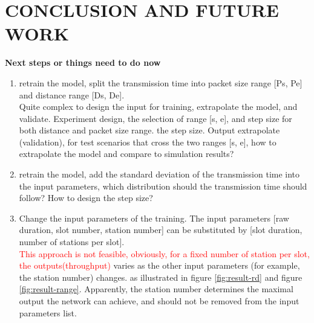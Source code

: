 \section{CONCLUSION AND FUTURE WORK \label{sec:conclusion}}

\textbf{Next steps or things need to do now}
\begin{enumerate}
\item retrain the model, split the transmission time into packet size range [Ps, Pe] and distance range [Ds, De]. \\
Quite complex to design the input for training, extrapolate the model, and  validate. Experiment design, the selection of range [s, e], and step size for both distance and packet size range. the step size. Output extrapolate (validation), for test scenarios that cross the two ranges [s, e], how to extrapolate the model and compare to simulation results?
\item retrain the model, add the standard deviation of the transmission time into the input parameters, which distribution should the transmission time should follow? How to design the step size? \\
\item Change the input parameters of the training. The input parameters [raw duration, slot number, station number] can be substituted by [slot duration, number of stations per slot]. \\
\textcolor{red}{This approach is not feasible, obviously, for a fixed number of station per slot, the outputs(throughput)} varies as the other input parameters (for example, the station number) changes. as illustrated in figure \ref{fig:result-rd} and figure \ref{fig:result-range}. Apparently, the station number determines the maximal output the network can achieve, and should not be removed from the input parameters list. 
\end{enumerate}
